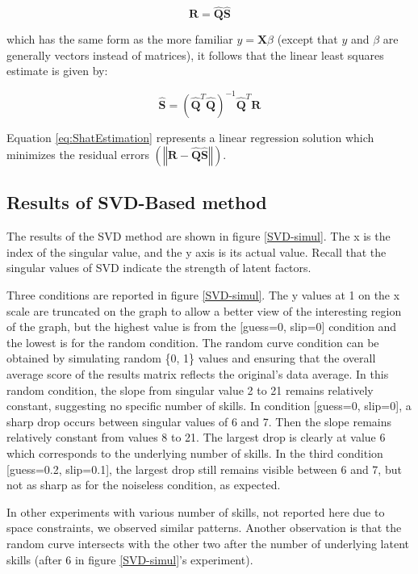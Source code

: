 \begin{equation}
\mathbf{R}=\hat{\mathbf{Q}}\hat{\mathbf{S}}\label{eq:Estimation}
\end{equation}


which has the same form as the more familiar $y=\mathbf{X}\beta$ (except that $y$ and $\beta$ are generally vectors instead of matrices), it follows that the linear least squares estimate is given by:

\begin{equation}
\hat{\mathbf{S}}=\left(\hat{\mathbf{Q}}^{T}\hat{\mathbf{Q}}\right)^{-1}\hat{\mathbf{Q}}^{T}\mathbf{R}\label{eq:ShatEstimation}
\end{equation}


Equation \ref{eq:ShatEstimation} represents a linear regression solution which minimizes the residual errors $\left(\left\Vert \mathbf{R}-\hat{\mathbf{Q}}\hat{\mathbf{S}}\right\Vert \right)$.

\subsection{Results of SVD-Based method}


The results of the SVD method are shown in figure \ref{SVD-simul}. The x is the index of the singular value, and the y axis is its actual value. Recall that the singular values of SVD indicate the strength of latent factors.

Three conditions are reported in figure \ref{SVD-simul}. The y values at 1 on the x scale are truncated on the graph to allow a better view of the interesting region of the graph, but the highest value is from the {[}guess=0, slip=0{]} condition and the lowest is for the random condition. The random curve condition can be obtained by simulating random \{0, 1\} values and ensuring that the overall average score of the results matrix reflects the original's data average. In this random condition, the slope from singular value 2 to 21 remains relatively constant, suggesting no specific number of skills. In condition {[}guess=0, slip=0{]}, a sharp drop occurs between singular values of 6 and 7. Then the slope remains relatively constant from values 8 to 21. The largest drop is clearly at value 6 which corresponds to the underlying number of skills. In the third condition {[}guess=0.2, slip=0.1{]}, the largest drop still remains visible between 6 and 7, but not as sharp as for the noiseless condition,
as expected.

In other experiments with various number of skills, not reported here due to space constraints, we observed similar patterns. Another observation is that the random curve intersects with the other two after the number of underlying latent skills (after 6 in figure \ref{SVD-simul}'s experiment).

